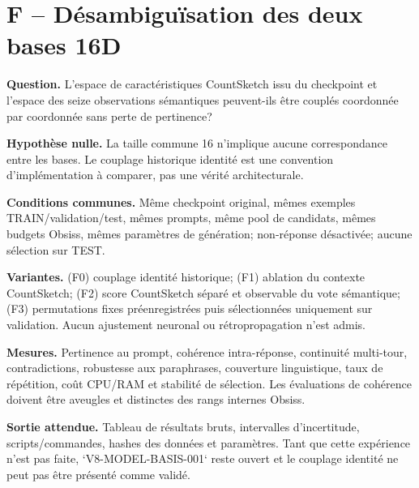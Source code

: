 \documentclass[11pt,a4paper]{report}
\begin{document}
\section{F -- Désambiguïsation des deux bases 16D}
\textbf{Question.} L'espace de caractéristiques CountSketch issu du checkpoint et l'espace des seize observations sémantiques peuvent-ils être couplés coordonnée par coordonnée sans perte de pertinence?

\textbf{Hypothèse nulle.} La taille commune 16 n'implique aucune correspondance entre les bases. Le couplage historique identité est une convention d'implémentation à comparer, pas une vérité architecturale.

\textbf{Conditions communes.} Même checkpoint original, mêmes exemples TRAIN/validation/test, mêmes prompts, même pool de candidats, mêmes budgets Obsiss, mêmes paramètres de génération; non-réponse désactivée; aucune sélection sur TEST.

\textbf{Variantes.} (F0) couplage identité historique; (F1) ablation du contexte CountSketch; (F2) score CountSketch séparé et observable du vote sémantique; (F3) permutations fixes préenregistrées puis sélectionnées uniquement sur validation. Aucun ajustement neuronal ou rétropropagation n'est admis.

\textbf{Mesures.} Pertinence au prompt, cohérence intra-réponse, continuité multi-tour, contradictions, robustesse aux paraphrases, couverture linguistique, taux de répétition, coût CPU/RAM et stabilité de sélection. Les évaluations de cohérence doivent être aveugles et distinctes des rangs internes Obsiss.

\textbf{Sortie attendue.} Tableau de résultats bruts, intervalles d'incertitude, scripts/commandes, hashes des données et paramètres. Tant que cette expérience n'est pas faite, `V8-MODEL-BASIS-001` reste ouvert et le couplage identité ne peut pas être présenté comme validé.
\end{document}
